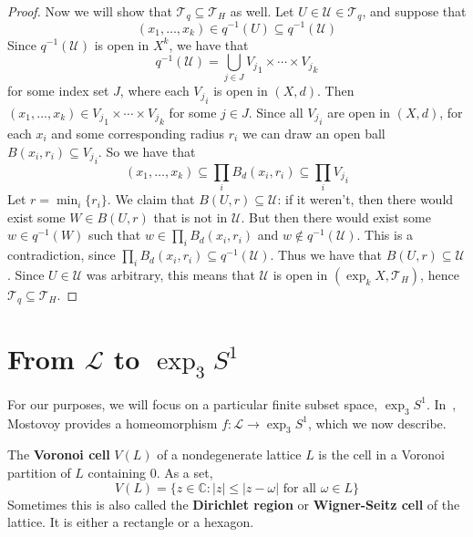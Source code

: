 \documentclass[12pt,twoside]{reedthesis}
\theoremstyle{definition}
\newcommand{\C}{\mathbb{C}}
\newcommand{\LS}{\mathcal{L}}
\newcommand{\defnphrase}[1]{\textbf{#1}}
\begin{document}
\begin{proof}
  Now we will show that $\mathcal{T}_q \subseteq \mathcal{T}_H$ as well.
  Let $U \in \mathcal{U} \in \mathcal{T}_q$, and suppose that
  \begin{equation*}
    (x_1, \ldots, x_k) \in q^{-1}(U) \subseteq q^{-1}(\mathcal{U})
  \end{equation*}
  Since $q^{-1}(\mathcal{U})$ is open in $X^k$, we have that 
  \begin{equation*}
    q^{-1}(\mathcal{U}) = \bigcup_{j \in J} {V_j}_1 \times \cdots \times {V_j}_k
  \end{equation*}
  for some index set $J$, where each ${V_j}_i$ is open in $(X,d)$.
  Then $(x_1, \ldots, x_k) \in {V_j}_1 \times \cdots \times {V_j}_k$ for some $j \in J$.
  Since all ${V_j}_i$ are open in $(X,d)$, for each $x_i$ and some corresponding radius $r_i$ we can draw an open ball $B(x_i, r_i) \subseteq {V_j}_i$.
  So we have that
  \begin{equation*}
    (x_1, \ldots, x_k) \subseteq \prod_i B_d(x_i, r_i) \subseteq \prod_i {V_j}_i
  \end{equation*}
  Let $r = \min_i \{ r_i \}$.
  We claim that $B(U, r) \subseteq \mathcal{U}$: if it weren't, then there would exist some $W \in B(U, r)$ that is not in $\mathcal{U}$.
  But then there would exist some $w \in q^{-1}(W)$ such that $w \in \prod_i B_d(x_i, r_i)$ and $w \notin q^{-1}(\mathcal{U})$.
  This is a contradiction, since $\prod_i B_d(x_i, r_i) \subseteq q^{-1}(\mathcal{U})$.
  Thus we have that $B(U, r) \subseteq \mathcal{U}$.
  Since $U \in \mathcal{U}$ was arbitrary, this means that $\mathcal{U}$ is open in $(\exp_k X, \mathcal{T}_H)$, hence $\mathcal{T}_q \subseteq \mathcal{T}_H$.
\end{proof}

\section{From $\LS$ to $\exp_3 S^1$}\label{subsec:lattice_to_exp}

For our purposes, we will focus on a particular finite subset space, $\exp_3 S^1$.
In~\cite{mostovoy2004}, Mostovoy provides a homeomorphism $f : \LS \to \exp_3 S^1$, which we now describe.

The \defnphrase{Voronoi cell} $V(L)$ of a nondegenerate lattice $L$ is the cell in a Voronoi partition of $L$ containing $0$.
As a set,
\begin{equation*}
  V(L) = \{ z \in \C : |z| \leq |z - \omega| \text{ for all } \omega \in L \}
\end{equation*}
Sometimes this is also called the \defnphrase{Dirichlet region} or \defnphrase{Wigner-Seitz cell} of the lattice.
It is either a rectangle or a hexagon.
\end{document}
